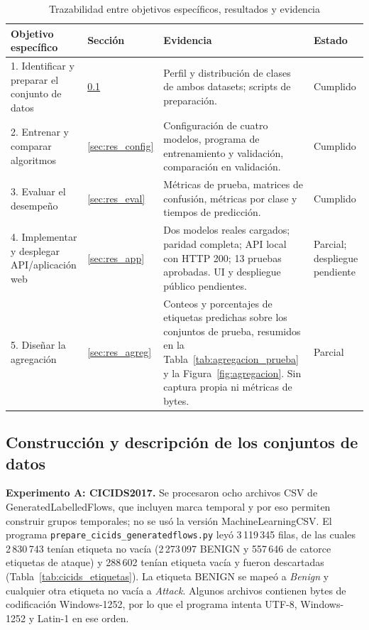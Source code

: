 \documentclass[conference]{IEEEtran}
\begin{document}
\begin{table}[!t]
\centering
\caption{Trazabilidad entre objetivos específicos, resultados y evidencia}
\label{tab:trazabilidad}
\small
\begin{tabular}{p{4.6cm}p{2.0cm}p{6.6cm}p{2.6cm}}
\toprule
\textbf{Objetivo específico} & \textbf{Sección} & \textbf{Evidencia} & \textbf{Estado} \\
\midrule
1. Identificar y preparar el conjunto de datos & \ref{sec:res_datos} & Perfil y distribución de clases de ambos datasets; scripts de preparación. & Cumplido \\
2. Entrenar y comparar algoritmos & \ref{sec:res_config} & Configuración de cuatro modelos, programa de entrenamiento y validación, comparación en validación. & Cumplido \\
3. Evaluar el desempeño & \ref{sec:res_eval} & Métricas de prueba, matrices de confusión, métricas por clase y tiempos de predicción. & Cumplido \\
4. Implementar y desplegar API/aplicación web & \ref{sec:res_app} & Dos modelos reales cargados; paridad completa; API local con HTTP 200; 13 pruebas aprobadas. UI y despliegue público pendientes. & Parcial; despliegue pendiente \\
5. Diseñar la agregación & \ref{sec:res_agreg} & Conteos y porcentajes de etiquetas predichas sobre los conjuntos de prueba, resumidos en la Tabla~\ref{tab:agregacion_prueba} y la Figura~\ref{fig:agregacion}. Sin captura propia ni métricas de bytes. & Parcial \\
\bottomrule
\end{tabular}
\end{table}

\subsection{Construcción y descripción de los conjuntos de datos}
\label{sec:res_datos}

\textbf{Experimento A: CICIDS2017.} Se procesaron ocho archivos CSV de GeneratedLabelledFlows, que incluyen marca temporal y por eso permiten construir grupos temporales; no se usó la versión MachineLearningCSV. El programa \texttt{prepare\_cicids\_generatedflows.py} leyó 3\,119\,345 filas, de las cuales 2\,830\,743 tenían etiqueta no vacía (2\,273\,097 BENIGN y 557\,646 de catorce etiquetas de ataque) y 288\,602 tenían etiqueta vacía y fueron descartadas (Tabla~\ref{tab:cicids_etiquetas}). La etiqueta BENIGN se mapeó a \textit{Benign} y cualquier otra etiqueta no vacía a \textit{Attack}. Algunos archivos contienen bytes de codificación Windows-1252, por lo que el programa intenta UTF-8, Windows-1252 y Latin-1 en ese orden.
\end{document}
